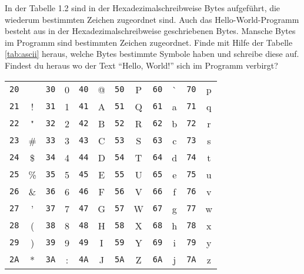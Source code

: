 \documentclass[10pt]{book}
\begin{document}
\begin{Exercise}[label=ex:asciidecode]
In der Tabelle 1.2 sind
in der Hexadezimalschreibweise Bytes aufgeführt,
die wiederum bestimmten Zeichen zugeordnet sind.
Auch das Hello-World-Programm besteht aus
in der Hexadezimalschreibweise geschriebenen Bytes.
Mansche Bytes im Programm sind bestimmten Zeichen zugeordnet.
Finde mit Hilfe der Tabelle \ref{tab:ascii} heraus,
welche Bytes bestimmte Symbole haben
und schreibe diese auf.
Findest du heraus wo der Text ``Hello, World!''
sich im Programm verbirgt?
\end{Exercise}

\begin{table}
\centering
\newcommand{\bs}{\textbackslash}
\begin{tabular}{ | rc | rc | rc | rc | rc | rc |}
\hline
\texttt{20} & ~    & \texttt{30} & 0    & \texttt{40} & @ &
\texttt{50} & P    & \texttt{60} & \`{} & \texttt{70} & p \\
\texttt{21} & !    & \texttt{31} & 1    & \texttt{41} & A &
\texttt{51} & Q    & \texttt{61} & a    & \texttt{71} & q \\
\texttt{22} & "    & \texttt{32} & 2    & \texttt{42} & B &
\texttt{52} & R    & \texttt{62} & b    & \texttt{72} & r \\
\texttt{23} & \#   & \texttt{33} & 3    & \texttt{43} & C &
\texttt{53} & S    & \texttt{63} & c    & \texttt{73} & s \\
\texttt{24} & \$   & \texttt{34} & 4    & \texttt{44} & D &
\texttt{54} & T    & \texttt{64} & d    & \texttt{74} & t \\
\texttt{25} & \%   & \texttt{35} & 5    & \texttt{45} & E &
\texttt{55} & U    & \texttt{65} & e    & \texttt{75} & u \\
\texttt{26} & \&   & \texttt{36} & 6    & \texttt{46} & F &
\texttt{56} & V    & \texttt{66} & f    & \texttt{76} & v \\
\texttt{27} & '    & \texttt{37} & 7    & \texttt{47} & G &
\texttt{57} & W    & \texttt{67} & g    & \texttt{77} & w \\
\texttt{28} & (    & \texttt{38} & 8    & \texttt{48} & H &
\texttt{58} & X    & \texttt{68} & h    & \texttt{78} & x \\
\texttt{29} & )    & \texttt{39} & 9    & \texttt{49} & I &
\texttt{59} & Y    & \texttt{69} & i    & \texttt{79} & y \\
\texttt{2A} & *    & \texttt{3A} & :    & \texttt{4A} & J &
\texttt{5A} & Z    & \texttt{6A} & j    & \texttt{7A} & z \\

\end{tabular}
\end{table}
\end{document}
